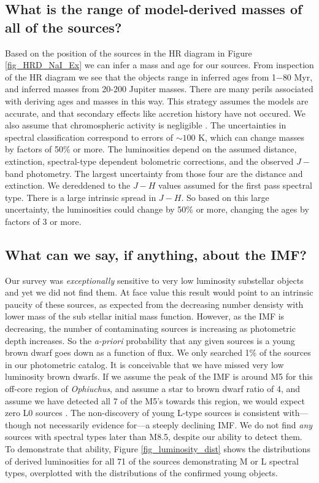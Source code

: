 \subsection{What is the range of model-derived masses of all of the sources?}
Based on the position of the sources in the HR diagram in Figure \ref{fig_HRD_NaI_Ex} we can infer a mass and age for our sources.  From inspection of the HR diagram we see that the objects range in inferred ages from 1$-$80 Myr, and inferred masses from 20-200 Jupiter masses.  There are many perils associated with deriving ages and masses in this way.  This strategy assumes the models are accurate, and that secondary effects like accretion history have not occured.  We also assume that chromospheric activity is negligible \citep{2014ApJ...796..119S}.  The uncertainties in spectral classification correspond to errors of $\sim100$ K, which can change masses by factors of 50\% or more.  The luminosities depend on the assumed distance, extinction, spectral-type dependent bolometric corrections, and the observed $J-$ band photometry.  The largest uncertainty from those four are the distance and extinction.  We dereddened to the $J-H$ values assumed for the first pass spectral type.  There is a large intrinsic spread in $J-H$.  So based on this large uncertainty, the luminosities could change by 50\% or more, changing the ages by factors of 3 or more.  


\subsection{What can we say, if anything, about the IMF?}

Our survey was \emph{exceptionally} sensitive to very low luminosity substellar objects and yet we did not find them.  At face value this result would point to an intrinsic paucity of these sources, as expected from the decreasing number densisty with lower mass of the sub stellar initial mass function.  However, as the IMF is decreasing, the number of contaminating sources is increasing as photometric depth increases.  So the \emph{a-priori} probability that any given sources is a young brown dwarf goes down as a function of flux.  We only searched 1\% of the sources in our photometric catalog.  It is conceivable that we have missed very low luminosity brown dwarfs.  If we assume the peak of the IMF is around M5 for this off-core region of \emph{Ophiuchus}, and assume a star to brown dwarf ratio of 4, and assume we have detected all 7 of the M5's towards this region, we would expect zero L0 sources \citep{2012ARA&A..50...65L}.  The non-discovery of young L-type sources is consistent with---though not necessarily evidence for---a steeply declining IMF.  We do not find \emph{any} sources with spectral types later than M8.5, despite our ability to detect them.  To demonstrate that ability, Figure \ref{fig_luminosity_dist} shows the distributions of derived luminosities for all 71 of the sources demonstrating M or L spectral types, overplotted with the distributions of the confirmed young objects.

